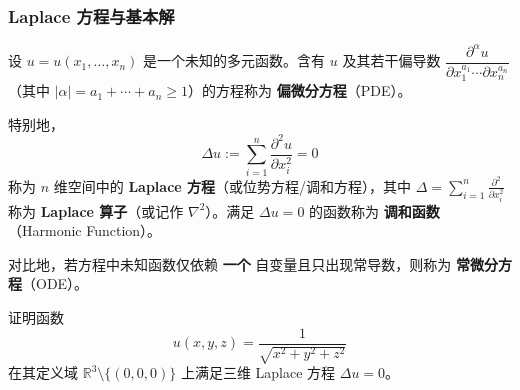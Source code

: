 \documentclass[lang=cn,11pt]{elegantbook}
\begin{document}
\subsubsection*{Laplace 方程与基本解}

\begin{definition}[偏微分方程的基本概念] \label{def:pde-intro}
设 $u=u(x_1,\dots,x_n)$ 是一个未知的多元函数。含有 $u$ 及其若干偏导数 $\dfrac{\partial^{\alpha}u}{\partial x_1^{a_1}\cdots\partial x_n^{a_n}}$（其中 $|\alpha|=a_1+\cdots+a_n\geq 1$）的方程称为 \textbf{偏微分方程}（PDE）。

特别地，
\[
\Delta u:=\sum_{i=1}^{n}\frac{\partial^2 u}{\partial x_i^2}=0
\]
称为 $n$ 维空间中的 \textbf{Laplace 方程}（或位势方程/调和方程），其中 $\displaystyle\Delta=\sum_{i=1}^n\frac{\partial^2}{\partial x_i^2}$ 称为 \textbf{Laplace 算子}（或记作 $\nabla^2$）。满足 $\Delta u=0$ 的函数称为 \textbf{调和函数}（Harmonic Function）。

对比地，若方程中未知函数仅依赖 \textbf{一个} 自变量且只出现常导数，则称为 \textbf{常微分方程}（ODE）。
\end{definition}

\begin{example} \label{ex:laplace-fundamental}
证明函数
\[
u(x,y,z)=\frac{1}{\sqrt{x^2+y^2+z^2}}
\]
在其定义域 $\mathbb R^3\setminus\{(0,0,0)\}$ 上满足三维 Laplace 方程 $\Delta u=0$。
\end{example}
\end{document}
